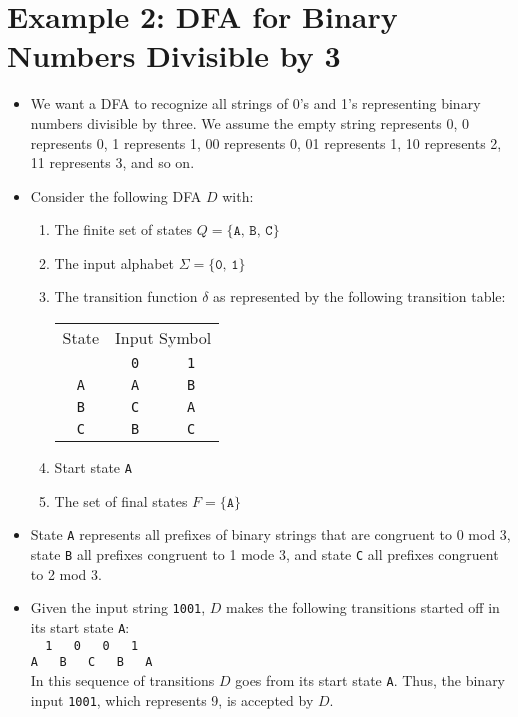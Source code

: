 \documentclass[]{article}
\begin{document}
\section{Example 2: DFA for Binary Numbers Divisible by 3}
  \begin{itemize}
    \item We want a DFA to recognize all strings of 0's and 1's representing 
    binary numbers divisible by three. We assume the empty string represents 0, 
    0 represents 0, 1 represents 1, 00 represents 0, 01 represents 1, 10 
    represents 2, 11 represents 3, and so on.
    \item Consider the following DFA $D$ with:
      \begin{enumerate}
        \item The finite set of states $Q = \{ \texttt{A, B, C} \}$
        \item The input alphabet $\Sigma = \{ \texttt{0, 1} \}$
        \item The transition function $\delta$ as represented by the following 
        transition table:
        
          \begin{tabular}{|c|c|c|}
            \hline
            State & \multicolumn{2}{|c|}{Input Symbol} \\ \cline{2-3}
                  & \texttt{0} & \texttt{1} \\ \hline
            \texttt{A} & \texttt{A} & \texttt{B} \\ \hline
            \texttt{B} & \texttt{C} & \texttt{A} \\ \hline
            \texttt{C} & \texttt{B} & \texttt{C} \\ \hline
          \end{tabular}    
        \item Start state \texttt{A}
        \item The set of final states $F = \{ \texttt{A} \}$
      \end{enumerate}
    \item State \texttt{A} represents all prefixes of binary strings that are 
    congruent to 0 mod 3, state \texttt{B} all prefixes congruent to 1 mode 3, 
    and state \texttt{C} all prefixes congruent to 2 mod 3.
    \item Given the input string \texttt{1001}, $D$ makes the following 
    transitions started off in its start state \texttt{A}:\\
    \verb|  1   0   0   1   | \\
    \verb|A   B   C   B   A | \\
    In this sequence of transitions $D$ goes from its start state \texttt{A}. 
    Thus, the binary input \texttt{1001}, which represents 9, is accepted by $D$.
  \end{itemize}
\end{document}
